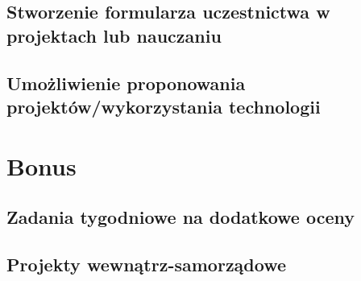 \documentclass[9pt,a4paper]{report}
\begin{document}
\section{Stworzenie formularza uczestnictwa w projektach lub nauczaniu}
\section{Umożliwienie proponowania projektów/wykorzystania technologii}

\chapter{Bonus}

\section{Zadania tygodniowe na dodatkowe oceny}
\section{Projekty wewnątrz-samorządowe}
\end{document}
